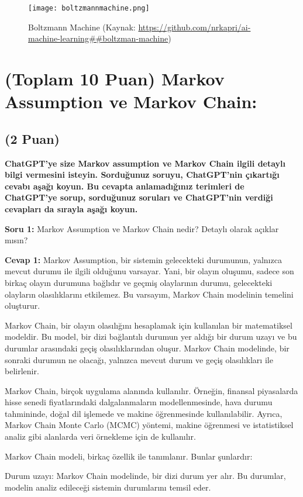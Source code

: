 \documentclass[11pt]{article}
\begin{document}
\begin{figure}[ht]
  \centering
  \shorthandoff{=}
  \texttt{[image: boltzmannmachine.png]}
  \shorthandoff{=}
  \caption[Şekil 1]{Boltzmann Machine (Kaynak: \url{https://github.com/nrkapri/ai-machine-learning##boltzman-machine})}
 
\end{figure}
\newpage
\section{(Toplam 10 Puan) Markov Assumption ve Markov Chain:}

\subsection{(2 Puan)} \textbf{ChatGPT’ye size Markov assumption ve Markov Chain ilgili detaylı bilgi vermesini isteyin. Sorduğunuz soruyu, ChatGPT'nin çıkartığı cevabı aşağı koyun. Bu cevapta anlamadığınız terimleri de ChatGPT’ye sorup, sorduğunuz soruları ve ChatGPT’nin verdiği cevapları da sırayla aşağı koyun.}


\textbf{Soru 1: } Markov Assumption ve Markov Chain nedir? Detaylı olarak açıklar mısın?

\textbf{Cevap 1: } Markov Assumption, bir sistemin gelecekteki durumunun, yalnızca mevcut durumu ile ilgili olduğunu varsayar. Yani, bir olayın oluşumu, sadece son birkaç olayın durumuna bağlıdır ve geçmiş olaylarının durumu, gelecekteki olayların olasılıklarını etkilemez. Bu varsayım, Markov Chain modelinin temelini oluşturur.

Markov Chain, bir olayın olasılığını hesaplamak için kullanılan bir matematiksel modeldir. Bu model, bir dizi bağlantılı durumun yer aldığı bir durum uzayı ve bu durumlar arasındaki geçiş olasılıklarından oluşur. Markov Chain modelinde, bir sonraki durumun ne olacağı, yalnızca mevcut durum ve geçiş olasılıkları ile belirlenir.

Markov Chain, birçok uygulama alanında kullanılır. Örneğin, finansal piyasalarda hisse senedi fiyatlarındaki dalgalanmaların modellenmesinde, hava durumu tahmininde, doğal dil işlemede ve makine öğrenmesinde kullanılabilir. Ayrıca, Markov Chain Monte Carlo (MCMC) yöntemi, makine öğrenmesi ve istatistiksel analiz gibi alanlarda veri örnekleme için de kullanılır.

Markov Chain modeli, birkaç özellik ile tanımlanır. Bunlar şunlardır:

Durum uzayı: Markov Chain modelinde, bir dizi durum yer alır. Bu durumlar, modelin analiz edileceği sistemin durumlarını temsil eder.
\end{document}
